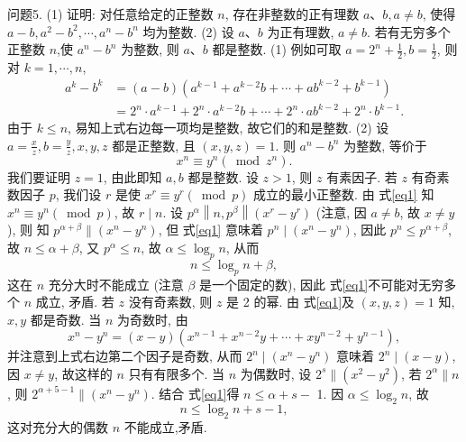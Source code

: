 问题5. (1) 证明: 对任意给定的正整数 $n$, 存在非整数的正有理数 $a 、 b, a \neq b$, 使得 $a-b, a^2-b^2, \cdots, a^n-b^n$ 均为整数.
(2) 设 $a 、 b$ 为正有理数, $a \neq b$. 若有无穷多个正整数 $n$,使 $a^n-b^n$ 为整数, 则 $a 、 b$ 都是整数.
(1) 例如可取 $a=2^n+\frac{1}{2}, b=\frac{1}{2}$, 则对 $k=1, \cdots, n$,
$$
\begin{aligned}
a^k-b^k & =(a-b)\left(a^{k-1}+a^{k-2} b+\cdots+a b^{k-2}+b^{k-1}\right) \\
& =2^n \cdot a^{k-1}+2^n \cdot a^{k-2} b+\cdots+2^n \cdot a b^{k-2}+2^n \cdot b^{k-1} .
\end{aligned}
$$
由于 $k \leqslant n$, 易知上式右边每一项均是整数, 故它们的和是整数.
(2) 设 $a=\frac{x}{z}, b=\frac{y}{z}, x, y, z$ 都是正整数, 且 $(x, y, z)=1$. 则 $a^n-b^n$ 为整数, 等价于
$$
x^n \equiv y^n\left(\bmod z^n\right) . \label{eq1}
$$
我们要证明 $z=1$, 由此即知 $a, b$ 都是整数.
设 $z>1$, 则 $z$ 有素因子.
若 $z$ 有奇素数因子 $p$, 我们设 $r$ 是使 $x^r \equiv y^r(\bmod p)$ 成立的最小正整数.
由 式\ref{eq1} 知 $x^n \equiv y^n(\bmod p)$, 故 $r \mid n$. 设 $p^\alpha\left\|n, p^\beta\right\|\left(x^r-y^r\right)$ (注意, 因 $a \neq b$, 故 $x \neq y$ ), 则 知 $p^{\alpha+\beta} \|\left(x^n-y^n\right)$, 但 式\ref{eq1} 意味着 $p^n \mid\left(x^n-y^n\right)$, 因此 $p^n \leqslant p^{\alpha+\beta}$, 故 $n \leqslant \alpha+\beta$, 又 $p^\alpha \leqslant n$, 故 $\alpha \leqslant \log _p n$, 从而
$$
n \leqslant \log _p n+\beta,
$$
这在 $n$ 充分大时不能成立 (注意 $\beta$ 是一个固定的数), 因此 式\ref{eq1}不可能对无穷多个 $n$ 成立, 矛盾.
若 $z$ 没有奇素数, 则 $z$ 是 2 的幂.
由 式\ref{eq1}及 $(x, y, z)=1$ 知, $x, y$ 都是奇数.
当 $n$ 为奇数时, 由
$$
x^n-y^n=(x-y)\left(x^{n-1}+x^{n-2} y+\cdots+x y^{n-2}+y^{n-1}\right),
$$
并注意到上式右边第二个因子是奇数, 从而 $2^n \mid\left(x^n-y^n\right)$ 意味着 $2^n \mid(x-y)$, 因 $x \neq y$, 故这样的 $n$ 只有有限多个.
当 $n$ 为偶数时, 设 $2^s \|\left(x^2-y^2\right)$, 若 $2^\alpha \| n$, 则 $2^{\alpha+5-1} \|\left(x^n-y^n\right)$. 结合 式\ref{eq1}得 $n \leqslant \alpha+s-$ 1. 因 $\alpha \leqslant \log _2 n$, 故
$$
n \leqslant \log _2 n+s-1,
$$
这对充分大的偶数 $n$ 不能成立,矛盾.



